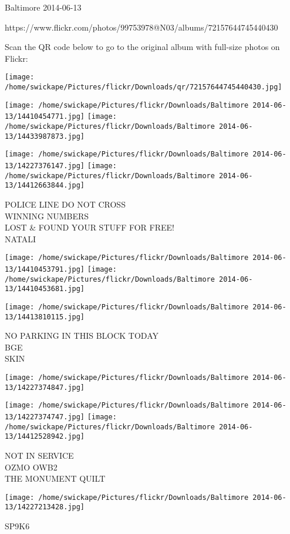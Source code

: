\documentclass[10pt,letterpaper]{article}
\begin{document}
Baltimore 2014-06-13

https://www.flickr.com/photos/99753978@N03/albums/72157644745440430

Scan the QR code below to go to the original album with full-size photos on Flickr:

\texttt{[image: /home/swickape/Pictures/flickr/Downloads/qr/72157644745440430.jpg]}
\pagebreak

\texttt{[image: /home/swickape/Pictures/flickr/Downloads/Baltimore 2014-06-13/14410454771.jpg]}
\texttt{[image: /home/swickape/Pictures/flickr/Downloads/Baltimore 2014-06-13/14433987873.jpg]}

\texttt{[image: /home/swickape/Pictures/flickr/Downloads/Baltimore 2014-06-13/14227376147.jpg]}
\texttt{[image: /home/swickape/Pictures/flickr/Downloads/Baltimore 2014-06-13/14412663844.jpg]}

POLICE LINE DO NOT CROSS\\
WINNING NUMBERS\\
LOST \& FOUND YOUR STUFF FOR FREE!\\
NATALI\\
\pagebreak

\texttt{[image: /home/swickape/Pictures/flickr/Downloads/Baltimore 2014-06-13/14410453791.jpg]}
\texttt{[image: /home/swickape/Pictures/flickr/Downloads/Baltimore 2014-06-13/14410453681.jpg]}

\texttt{[image: /home/swickape/Pictures/flickr/Downloads/Baltimore 2014-06-13/14413810115.jpg]}

NO PARKING IN THIS BLOCK TODAY\\
BGE\\
SKIN\\
\pagebreak

\texttt{[image: /home/swickape/Pictures/flickr/Downloads/Baltimore 2014-06-13/14227374847.jpg]}

\vspace{0.25in}
\texttt{[image: /home/swickape/Pictures/flickr/Downloads/Baltimore 2014-06-13/14227374747.jpg]}
\texttt{[image: /home/swickape/Pictures/flickr/Downloads/Baltimore 2014-06-13/14412528942.jpg]}

NOT IN SERVICE\\
OZMO OWB2\\
THE MONUMENT QUILT\\
\pagebreak

\texttt{[image: /home/swickape/Pictures/flickr/Downloads/Baltimore 2014-06-13/14227213428.jpg]}

SP9K6\\
\pagebreak
\end{document}
